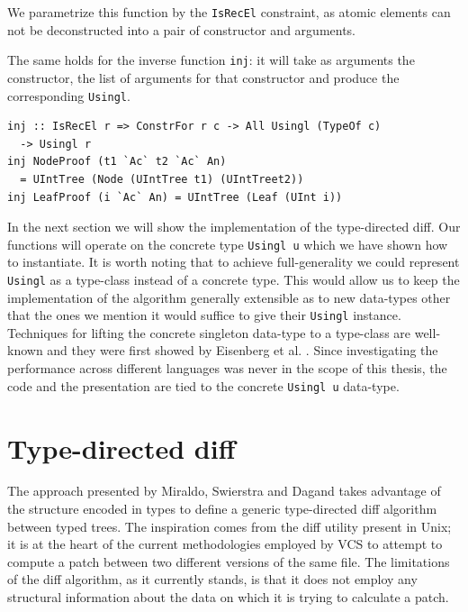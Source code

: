 \documentclass[11pt, titlepage]{article}
\newcommand{\toHaskell}[1]{\texttt{#1}\xspace}
\begin{document}
We parametrize this function by the \toHaskell{IsRecEl} constraint, as atomic elements can not be deconstructed into a pair of constructor and arguments.

The same holds for the inverse function \toHaskell{inj}: it will take as arguments the constructor, the list of arguments for that constructor and produce the corresponding \toHaskell{Usingl}.

\begin{verbatim}
inj :: IsRecEl r => ConstrFor r c -> All Usingl (TypeOf c) 
  -> Usingl r
inj NodeProof (t1 `Ac` t2 `Ac` An) 
  = UIntTree (Node (UIntTree t1) (UIntTreet2))
inj LeafProof (i `Ac` An) = UIntTree (Leaf (UInt i))
\end{verbatim}

In the next section we will show the implementation of the type-directed diff. Our functions will operate on the concrete type \toHaskell{Usingl u} which we have shown how to instantiate.
It is worth noting that to achieve full-generality we could represent \toHaskell{Usingl} as a type-class instead of a concrete type. This would allow us to keep the implementation of the algorithm generally extensible as to new data-types other that the ones we mention it would suffice to give their \toHaskell{Usingl} instance. 
Techniques for lifting the concrete singleton data-type to a type-class are well-known and they were first showed by Eisenberg et al. \cite{singletons}. 
Since investigating the performance across different languages was never in the scope of this thesis, the code and the presentation are tied to the concrete \toHaskell{Usingl u} data-type.

\section{Type-directed diff}\label{type-directed-diff}

The approach presented by Miraldo, Swierstra and Dagand \cite{type-directed-diff} takes advantage of the structure encoded in types to define a generic type-directed diff algorithm between typed trees. 
The inspiration comes from the diff utility present in Unix; it is at the heart of the current methodologies employed by VCS to attempt to compute a patch between two different versions of the same file. 
The limitations of the diff algorithm, as it currently stands, is that it does not employ any structural information about the data on which it is trying to calculate a patch. 
\end{document}
